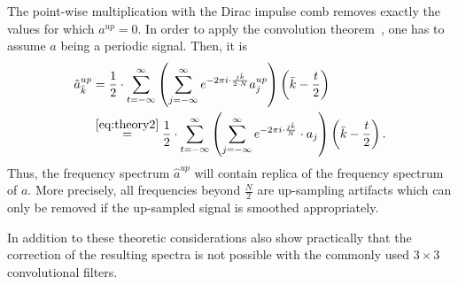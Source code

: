 \documentclass[letterpaper]{article} %
\begin{document}

The point-wise multiplication with the Dirac impulse comb removes exactly the values for which $a^{up}=0$. In order to apply the convolution theorem~\cite{conv-theorem}, one has to assume $a$ being a periodic signal. Then, it is
\begin{align}\hat{a}^{up}_{\bar{k}} &
=\frac{1}{2}\cdot  \sum_{t=-\infty}^{\infty} \left(\sum_{j=-\infty}^{\infty}%
e^{-2\pi i\cdot\frac{j\bar{k}}{2\cdot N}}a^{up}_j\right)\left(\bar{k}-\frac{t}{2}\right)\, \nonumber\\
&\overset{\eqref{eq:theory2}}{=}\frac{1}{2}\cdot  \sum_{t=-\infty}^{\infty} \left(\sum_{j=-\infty}^{\infty}%
e^{-2\pi i\cdot\frac{j\bar{k}}{N}}\cdot a_j\right)\left(\bar{k}-\frac{t}{2}\right).
\end{align}
Thus, the frequency spectrum $\hat{a}^{up}$ will contain replica of the frequency spectrum of $a$. More precisely, all frequencies beyond $\frac{N}{2}$ are up-sampling artifacts which can only be removed if the up-sampled signal is smoothed appropriately.


In addition to these theoretic considerations \cite{margret2020upconvolution} also show practically that the correction of the resulting spectra is not possible with the commonly used $3\times 3$ convolutional filters.
\end{document}
